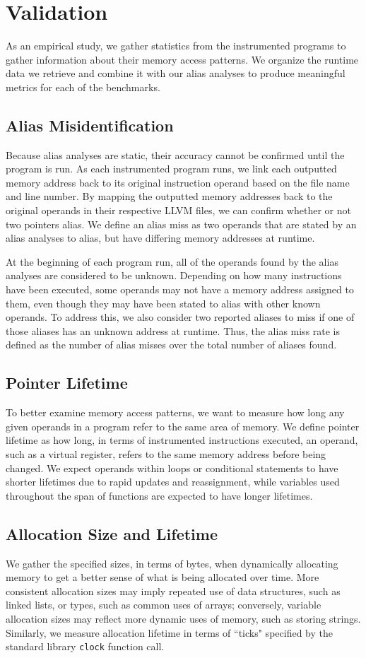 \chapter{Validation}

As an empirical study, we gather statistics from the instrumented programs to gather information about their memory access patterns. We organize the runtime data we retrieve and combine it with our alias analyses to produce meaningful metrics for each of the benchmarks.

\section{Alias Misidentification}
Because alias analyses are static, their accuracy cannot be confirmed until the program is run. As each instrumented program runs, we link each outputted memory address back to its original instruction operand based on the file name and line number. By mapping the outputted memory addresses back to the original operands in their respective LLVM files, we can confirm whether or not two pointers alias. We define an alias miss as two operands that are stated by an alias analyses to alias, but have differing memory addresses at runtime.

At the beginning of each program run, all of the operands found by the alias analyses are considered to be unknown. Depending on how many instructions have been executed, some operands may not have a memory address assigned to them, even though they may have been stated to alias with other known operands. To address this, we also consider two reported aliases to miss if one of those aliases has an unknown address at runtime. Thus, the alias miss rate is defined as the number of alias misses over the total number of aliases found.

\section{Pointer Lifetime}
To better examine memory access patterns, we want to measure how long any given operands in a program refer to the same area of memory. We define pointer lifetime as how long, in terms of instrumented instructions executed, an operand, such as a virtual register, refers to the same memory address before being changed. We expect operands within loops or conditional statements to have shorter lifetimes due to rapid updates and reassignment, while variables used throughout the span of functions are expected to have longer lifetimes.

\section{Allocation Size and Lifetime}
We gather the specified sizes, in terms of bytes, when dynamically allocating memory to get a better sense of what is being allocated over time. More consistent allocation sizes may imply repeated use of data structures, such as linked lists, or types, such as common uses of arrays; conversely, variable allocation sizes may reflect more dynamic uses of memory, such as storing strings. Similarly, we measure allocation lifetime in terms of ``ticks" specified by the standard library \texttt{clock} function call.

